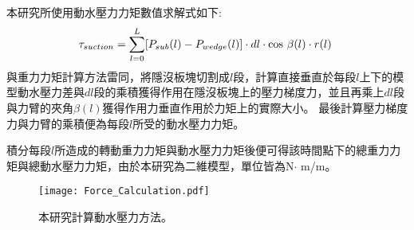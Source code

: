 本研究所使用動水壓力力矩數值求解式如下:
\begin{align}
    \tau_{suction} =  \sum ^L_{l=0} [P_{sub}(l)-P_{wedge}(l)]\cdot dl \cdot {\rm cos}\ \beta(l)\cdot r(l)\ 
    \label{eqn:tau_suction}
\end{align}
與重力力矩計算方法雷同，將隱沒板塊切割成$l$段，計算直接垂直於每段$l$上下的模型動水壓力差與$dl$段的乘積獲得作用在隱沒板塊上的壓力梯度力，並且再乘上$dl$段與力臂的夾角$\beta(l)$獲得作用力垂直作用於力矩上的實際大小。
最後計算壓力梯度力與力臂的乘積便為每段$l$所受的動水壓力力矩。

積分每段$l$所造成的轉動重力力矩與動水壓力力矩後便可得該時間點下的總重力力矩與總動水壓力力矩，由於本研究為二維模型，單位皆為N$\cdot$ m/m。

\begin{figure*}[ht!]
    \centering
    \texttt{[image: Force\_Calculation.pdf]}
    \caption[本研究計算動水壓力方法]{本研究計算動水壓力方法。}
    \label{fig::force_calculation}
\end{figure*}

